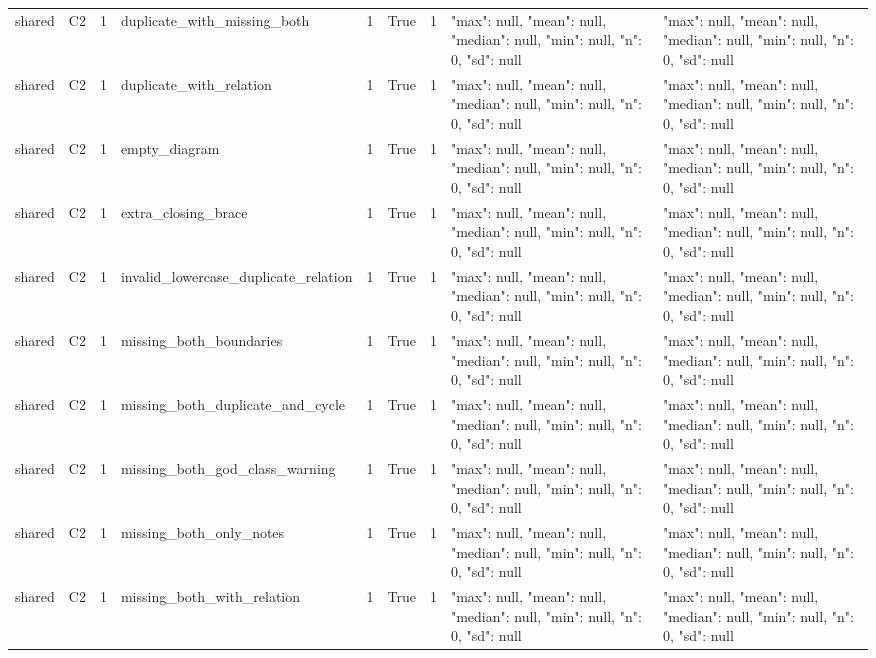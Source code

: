 \begin{tabular}{lllllllll}
shared & C2 & 1 & duplicate\_with\_missing\_both & 1 & True & 1 & {"max": null, "mean": null, "median": null, "min": null, "n": 0, "sd": null} & {"max": null, "mean": null, "median": null, "min": null, "n": 0, "sd": null} \\
shared & C2 & 1 & duplicate\_with\_relation & 1 & True & 1 & {"max": null, "mean": null, "median": null, "min": null, "n": 0, "sd": null} & {"max": null, "mean": null, "median": null, "min": null, "n": 0, "sd": null} \\
shared & C2 & 1 & empty\_diagram & 1 & True & 1 & {"max": null, "mean": null, "median": null, "min": null, "n": 0, "sd": null} & {"max": null, "mean": null, "median": null, "min": null, "n": 0, "sd": null} \\
shared & C2 & 1 & extra\_closing\_brace & 1 & True & 1 & {"max": null, "mean": null, "median": null, "min": null, "n": 0, "sd": null} & {"max": null, "mean": null, "median": null, "min": null, "n": 0, "sd": null} \\
shared & C2 & 1 & invalid\_lowercase\_duplicate\_relation & 1 & True & 1 & {"max": null, "mean": null, "median": null, "min": null, "n": 0, "sd": null} & {"max": null, "mean": null, "median": null, "min": null, "n": 0, "sd": null} \\
shared & C2 & 1 & missing\_both\_boundaries & 1 & True & 1 & {"max": null, "mean": null, "median": null, "min": null, "n": 0, "sd": null} & {"max": null, "mean": null, "median": null, "min": null, "n": 0, "sd": null} \\
shared & C2 & 1 & missing\_both\_duplicate\_and\_cycle & 1 & True & 1 & {"max": null, "mean": null, "median": null, "min": null, "n": 0, "sd": null} & {"max": null, "mean": null, "median": null, "min": null, "n": 0, "sd": null} \\
shared & C2 & 1 & missing\_both\_god\_class\_warning & 1 & True & 1 & {"max": null, "mean": null, "median": null, "min": null, "n": 0, "sd": null} & {"max": null, "mean": null, "median": null, "min": null, "n": 0, "sd": null} \\
shared & C2 & 1 & missing\_both\_only\_notes & 1 & True & 1 & {"max": null, "mean": null, "median": null, "min": null, "n": 0, "sd": null} & {"max": null, "mean": null, "median": null, "min": null, "n": 0, "sd": null} \\
shared & C2 & 1 & missing\_both\_with\_relation & 1 & True & 1 & {"max": null, "mean": null, "median": null, "min": null, "n": 0, "sd": null} & {"max": null, "mean": null, "median": null, "min": null, "n": 0, "sd": null} \\

\end{tabular}

